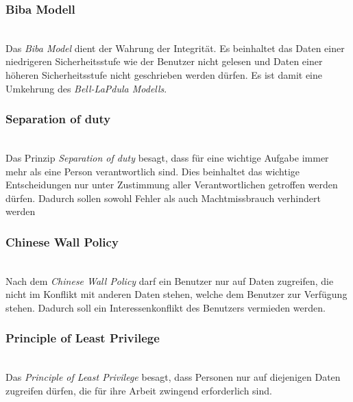 \subsubsection*{Biba Modell}\hspace*{\fill} \\
Das \textit{Biba Model} dient der Wahrung der Integrität. Es beinhaltet das Daten einer niedrigeren Sicherheitsstufe wie der Benutzer nicht gelesen und Daten einer höheren Sicherheitsstufe nicht geschrieben werden dürfen. Es ist damit eine Umkehrung des \textit{Bell-LaPdula Modells}.
\subsubsection*{Separation of duty}\hspace*{\fill} \\
Das Prinzip \textit{Separation of duty} besagt, dass für eine wichtige Aufgabe immer mehr als eine Person verantwortlich sind. Dies beinhaltet das wichtige Entscheidungen nur unter Zustimmung aller Verantwortlichen getroffen werden dürfen. Dadurch sollen sowohl Fehler als auch Machtmissbrauch verhindert werden
\subsubsection*{Chinese Wall Policy}\hspace*{\fill} \\
Nach dem \textit{Chinese Wall Policy} darf ein Benutzer nur auf Daten zugreifen, die nicht im Konflikt mit anderen Daten stehen, welche dem Benutzer zur Verfügung stehen. Dadurch soll ein Interessenkonflikt des Benutzers vermieden werden. 
\subsubsection*{Principle of Least Privilege}\hspace*{\fill} \\
Das \textit{Principle of Least Privilege} besagt, dass Personen nur auf diejenigen Daten zugreifen dürfen, die für ihre Arbeit zwingend erforderlich sind.
